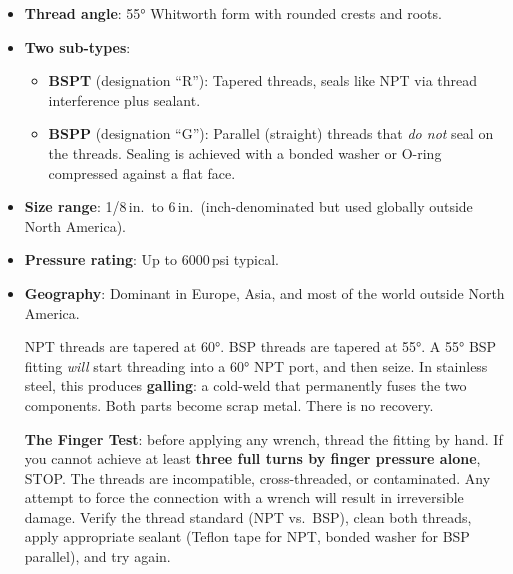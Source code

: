 \begin{itemize}[leftmargin=1.5em]
  \item \textbf{Thread angle}: \ang{55} Whitworth form with rounded crests and roots.
  \item \textbf{Two sub-types}:
  \begin{itemize}[nosep]
    \item \textbf{BSPT} (designation ``R''): Tapered threads, seals like NPT via thread interference plus sealant.
    \item \textbf{BSPP} (designation ``G''): Parallel (straight) threads that \emph{do not} seal on the threads. Sealing is achieved with a bonded washer or O-ring compressed against a flat face.
  \end{itemize}
  \item \textbf{Size range}: 1/8\,in.\ to 6\,in.\ (inch-denominated but used globally outside North America).
  \item \textbf{Pressure rating}: Up to 6000\,psi typical.
  \item \textbf{Geography}: Dominant in Europe, Asia, and most of the world outside North America.
\begin{warningbox}
NPT threads are tapered at \ang{60}. BSP threads are tapered at \ang{55}. A \ang{55} BSP fitting \emph{will} start threading into a \ang{60} NPT port, and then seize. In stainless steel, this produces \textbf{galling}: a cold-weld that permanently fuses the two components. Both parts become scrap metal. There is no recovery.

\textbf{The Finger Test}: before applying any wrench, thread the fitting by hand. If you cannot achieve at least \textbf{three full turns by finger pressure alone}, STOP. The threads are incompatible, cross-threaded, or contaminated. Any attempt to force the connection with a wrench will result in irreversible damage. Verify the thread standard (NPT vs.\ BSP), clean both threads, apply appropriate sealant (Teflon tape for NPT, bonded washer for BSP parallel), and try again.
\end{warningbox}
\end{itemize}


